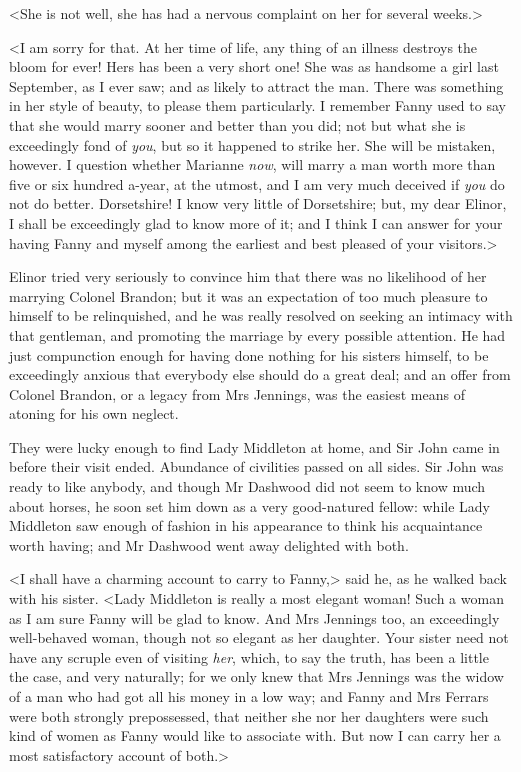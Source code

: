 <She is not well, she has had a nervous complaint on her for several weeks.>

<I am sorry for that. At her time of life, any thing of an illness destroys the bloom for ever! Hers has been a very short one! She was as handsome a girl last September, as I ever saw; and as likely to attract the man. There was something in her style of beauty, to please them particularly. I remember Fanny used to say that she would marry sooner and better than you did; not but what she is exceedingly fond of \textit{you}, but so it happened to strike her. She will be mistaken, however. I question whether Marianne \textit{now}, will marry a man worth more than five or six hundred a-year, at the utmost, and I am very much deceived if \textit{you} do not do better. Dorsetshire! I know very little of Dorsetshire; but, my dear Elinor, I shall be exceedingly glad to know more of it; and I think I can answer for your having Fanny and myself among the earliest and best pleased of your visitors.>

Elinor tried very seriously to convince him that there was no likelihood of her marrying Colonel Brandon; but it was an expectation of too much pleasure to himself to be relinquished, and he was really resolved on seeking an intimacy with that gentleman, and promoting the marriage by every possible attention. He had just compunction enough for having done nothing for his sisters himself, to be exceedingly anxious that everybody else should do a great deal; and an offer from Colonel Brandon, or a legacy from Mrs Jennings, was the easiest means of atoning for his own neglect.

They were lucky enough to find Lady Middleton at home, and Sir John came in before their visit ended. Abundance of civilities passed on all sides. Sir John was ready to like anybody, and though Mr Dashwood did not seem to know much about horses, he soon set him down as a very good-natured fellow: while Lady Middleton saw enough of fashion in his appearance to think his acquaintance worth having; and Mr Dashwood went away delighted with both.

<I shall have a charming account to carry to Fanny,> said he, as he walked back with his sister. <Lady Middleton is really a most elegant woman! Such a woman as I am sure Fanny will be glad to know. And Mrs Jennings too, an exceedingly well-behaved woman, though not so elegant as her daughter. Your sister need not have any scruple even of visiting \textit{her}, which, to say the truth, has been a little the case, and very naturally; for we only knew that Mrs Jennings was the widow of a man who had got all his money in a low way; and Fanny and Mrs Ferrars were both strongly prepossessed, that neither she nor her daughters were such kind of women as Fanny would like to associate with. But now I can carry her a most satisfactory account of both.>